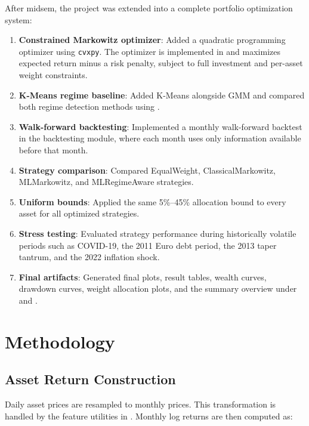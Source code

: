 \documentclass[11pt,a4paper]{article}
\begin{document}
After midsem, the project was extended into a complete portfolio optimization system:

\begin{enumerate}[leftmargin=*]
    \item \textbf{Constrained Markowitz optimizer}: Added a quadratic programming optimizer using \texttt{cvxpy}. The optimizer is implemented in  and maximizes expected return minus a risk penalty, subject to full investment and per-asset weight constraints.
    \item \textbf{K-Means regime baseline}: Added K-Means alongside GMM and compared both regime detection methods using .
    \item \textbf{Walk-forward backtesting}: Implemented a monthly walk-forward backtest in the backtesting module, where each month uses only information available before that month.
    \item \textbf{Strategy comparison}: Compared EqualWeight, ClassicalMarkowitz, MLMarkowitz, and MLRegimeAware strategies.
    \item \textbf{Uniform bounds}: Applied the same 5\%--45\% allocation bound to every asset for all optimized strategies.
    \item \textbf{Stress testing}: Evaluated strategy performance during historically volatile periods such as COVID-19, the 2011 Euro debt period, the 2013 taper tantrum, and the 2022 inflation shock.
    \item \textbf{Final artifacts}: Generated final plots, result tables, wealth curves, drawdown curves, weight allocation plots, and the summary overview under  and .
\end{enumerate}

\section{Methodology}

\subsection{Asset Return Construction}

Daily asset prices are resampled to monthly prices. This transformation is handled by the feature utilities in . Monthly log returns are then computed as:
\end{document}
